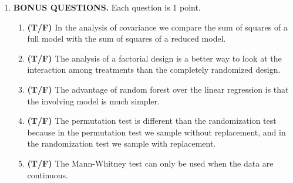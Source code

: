 \documentclass[11pt]{article}
\begin{document}
\begin{enumerate}
\begin{enumerate}
\item (2) Quantitative dependent, quantitative independent\\[1.5in]
\end{enumerate} 
\item \textbf{BONUS QUESTIONS.} Each question is 1 point.
\begin{enumerate}
\item \textbf{(T/F)} In the analysis of covariance we compare the sum of squares of a full model with the sum of squares of a reduced model.
\item \textbf{(T/F)} The analysis of a factorial design is a better way to look at the interaction among treatments than the completely randomized design.
\item \textbf{(T/F)} The advantage of random forest over the linear regression is that the involving model is much simpler.
\item \textbf{(T/F)} The permutation test is different than the randomization test because in the permutation test we sample without replacement, and in the randomization test we sample with replacement.
\item \textbf{(T/F)} The Mann-Whitney test can only be used when the data are continuous.
\end{enumerate}
\end{enumerate}
\end{document}
